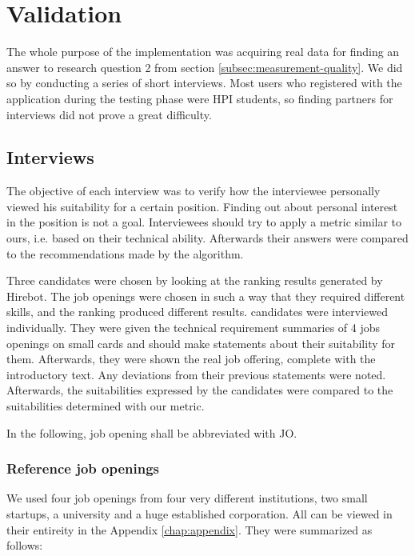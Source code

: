 \chapter{Validation}\label{ch:validation}
The whole purpose of the implementation was acquiring real data for finding an answer to research question 2 from section \ref{subsec:measurement-quality}. We did so by conducting a series of short interviews. Most users who registered with the application during the testing phase were HPI students, so finding partners for interviews did not prove a great difficulty.

\section{Interviews}\label{sec:interviews}
The objective of each interview was to verify how the interviewee personally viewed his suitability for a certain position. Finding out about personal interest in the position is not a goal. Interviewees should try to apply a metric similar to ours, i.e. based on their technical ability. Afterwards their answers were compared to the recommendations made by the algorithm.

Three candidates were chosen by looking at the ranking results generated by Hirebot. The job openings were chosen in such a way that they required different skills, and the ranking produced different results. candidates were interviewed individually. They were given the technical requirement summaries of 4 jobs openings on small cards and should make statements about their suitability for them. Afterwards, they were shown the real job offering, complete with the introductory text. Any deviations from their previous statements were noted. Afterwards, the suitabilities expressed by the candidates were compared to the suitabilities determined with our metric.

In the following, job opening shall be abbreviated with JO.

\subsection{Reference job openings}
We used four job openings from four very different institutions,
two small startups, a university and a huge established corporation.
All can be viewed in their entireity in the Appendix \ref{chap:appendix}.
They were summarized as follows:


